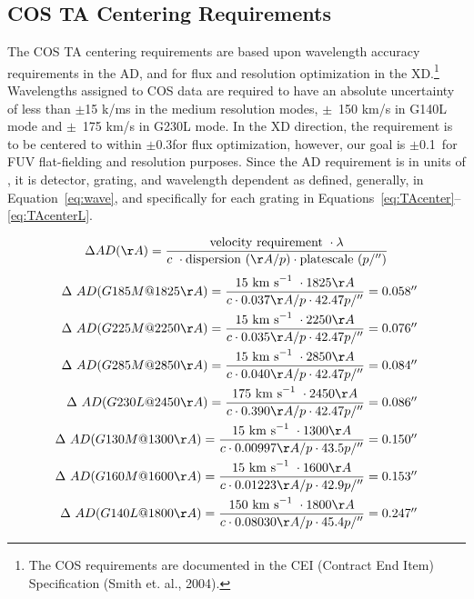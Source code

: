 \subsection{COS TA Centering Requirements}\label{subsec:requirements}

The COS TA centering requirements are based upon wavelength accuracy requirements in the AD, and for flux and resolution optimization
in the XD.\footnote{The COS requirements are documented in the CEI (Contract End Item) Specification (Smith et. al., 2004).}
Wavelengths assigned to COS data are required to have an absolute uncertainty of less than $\pm$15 k/ms in the medium resolution modes, $\pm$~150 km/s in G140L mode and $\pm$~175 km/s in G230L mode.
In the XD direction, the requirement is to be centered to within $\pm$0.3\arcsec for flux optimization, however, our goal is $\pm$0.1\arcsec\ for FUV flat-fielding and resolution purposes.
Since the AD requirement is in units of \kmsno, it is detector, grating, and wavelength dependent as defined, generally, in Equation~\ref{eq:wave}, and specifically
for each grating in Equations~\ref{eq:TAcenter}--\ref{eq:TAcenterL}.

\begin{equation}
\Delta AD (\AA) ={ {{\rm velocity\ requirement}\ \cdot \lambda}\over{ c~\cdot {\rm dispersion}\ (\AA/p) \cdot {\rm platescale}\ (p/\arcsec)}}
\label{eq:wave}
\end{equation}
\begin{eqnarray}\label{eq:TAcenter}
\setlength\itemsep{0.1em}
\Delta\ AD(G185M@1825\AA) = {{ 15\kms \cdot 1825\AA}\over{c \cdot 0 .037\AA/p\cdot 42.47 p/\arcsec}}  = 0.058\arcsec\\
\Delta\ AD(G225M@2250\AA) = {{ 15\kms \cdot 2250\AA}\over{c \cdot  0.035\AA/p\cdot 42.47 p/\arcsec}}  = 0.076\arcsec\\
\Delta\ AD(G285M@2850\AA) = {{ 15\kms \cdot 2850\AA}\over{c \cdot  0.040\AA/p\cdot 42.47 p/\arcsec}}  = 0.084\arcsec\\
\Delta\ AD(G230L@2450\AA) = {{175\kms \cdot 2450\AA}\over{c \cdot  0.390\AA/p\cdot 42.47 p/\arcsec}}  = 0.086\arcsec\\
\Delta\ AD(G130M@1300\AA) = {{ 15\kms \cdot 1300\AA}\over{c \cdot 0.00997\AA/ p\cdot 43.5 p/\arcsec}} = 0.150\arcsec\\
\Delta\ AD(G160M@1600\AA) = {{ 15\kms \cdot 1600\AA}\over{c \cdot 0.01223\AA/ p\cdot 42.9 p/\arcsec}} = 0.153\arcsec\\
\Delta\ AD(G140L@1800\AA) = {{150\kms \cdot 1800\AA}\over{c \cdot 0.08030\AA/ p\cdot 45.4 p/\arcsec}} = 0.247\arcsec\label{eq:TAcenterL}
\end{eqnarray}
\normalsize

